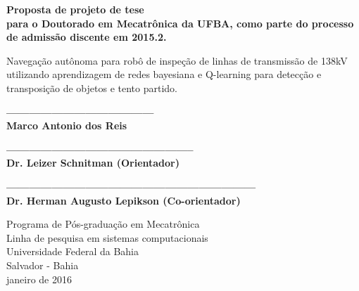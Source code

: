 \begin{center}
  \vspace*{0.8cm}
  {\Large \bf Proposta de projeto de tese \\
  para o Doutorado em Mecatrônica da UFBA, como parte do processo de admissão discente em 2015.2.}

  \vspace*{2.5cm}

  {\Large Navegação autônoma para robô de inspeção de linhas de transmissão de 138kV utilizando aprendizagem de redes bayesiana e Q-learning para detecção e transposição de objetos e tento partido.}
  \vspace*{2.5cm}
  
  {\bf ---------------------------------------\\
  Marco Antonio dos Reis}
  
  \vspace*{1.5cm}
  {\bf --------------------------------------------------\\
  Dr. Leizer Schnitman (Orientador)}
  
   \vspace*{1.5cm}
  {\bf ------------------------------------------------------------------\\
  Dr. Herman Augusto Lepikson (Co-orientador)}
  
   \begin{center}
   \end{center}
	\vspace*{0.3cm}

  {Programa de Pós-graduação em Mecatrônica\\
          [-3mm] Linha de pesquisa em sistemas computacionais\\
          [-3mm] Universidade Federal da Bahia\\
          [-3mm] Salvador - Bahia\\
          [-3mm] janeiro de 2016}
\end{center}

\newpage
\thispagestyle{empty}
\begin{center}
 \vspace*{2cm}
\end{center}


